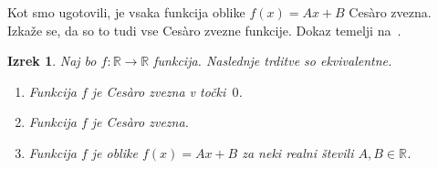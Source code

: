 \documentclass[a4paper,12pt]{article}
\theoremstyle{definition}
\theoremstyle{plain}
\newtheorem{izrek}{Izrek}
\begin{document}
Kot smo ugotovili, je vsaka funkcija oblike $f(x) = Ax + B$ Ces\`{a}ro zvezna. Izkaže se, da so to tudi vse Ces\`{a}ro zvezne funkcije. Dokaz temelji na~\cite[stran 247-248]{2}.

\begin{izrek}
    \label{klaszvez}
    Naj bo $f: \mathbb{R} \rightarrow \mathbb{R}$ funkcija. Naslednje trditve so ekvivalentne.
    \begin{enumerate}
        \item Funkcija $f$ je Ces\`{a}ro zvezna v točki~$0$.
        \item Funkcija $f$ je Ces\`{a}ro zvezna.
        \item Funkcija $f$ je oblike $f(x) = Ax + B$ za neki realni števili $A, B \in \mathbb{R}$.
    \end{enumerate}
\end{izrek}
\end{document}
